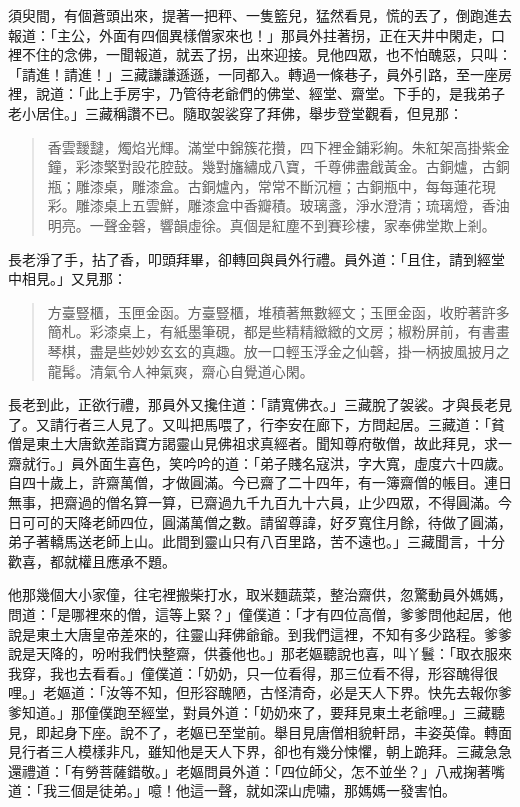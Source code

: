 須臾間，有個蒼頭出來，提著一把秤、一隻籃兒，猛然看見，慌的丟了，倒跑進去報道：「主公，外面有四個異樣僧家來也！」那員外拄著拐，正在天井中閑走，口裡不住的念佛，一聞報道，就丟了拐，出來迎接。見他四眾，也不怕醜惡，只叫：「請進！請進！」三藏謙謙遜遜，一同都入。轉過一條巷子，員外引路，至一座房裡，說道：「此上手房宇，乃管待老爺們的佛堂、經堂、齋堂。下手的，是我弟子老小居住。」三藏稱讚不已。隨取袈裟穿了拜佛，舉步登堂觀看，但見那：
\begin{quote}
香雲靉靆，燭焰光輝。滿堂中錦簇花攢，四下裡金鋪彩絢。朱紅架高掛紫金鐘，彩漆檠對設花腔鼓。幾對旛繡成八寶，千尊佛盡戧黃金。古銅爐，古銅瓶；雕漆桌，雕漆盒。古銅爐內，常常不斷沉檀；古銅瓶中，每每蓮花現彩。雕漆桌上五雲鮮，雕漆盒中香瓣積。玻璃盞，淨水澄清；琉璃燈，香油明亮。一聲金磬，響韻虛徐。真個是紅塵不到賽珍樓，家奉佛堂欺上剎。
\end{quote}

長老淨了手，拈了香，叩頭拜畢，卻轉回與員外行禮。員外道：「且住，請到經堂中相見。」又見那：
\begin{quote}
方臺豎櫃，玉匣金函。方臺豎櫃，堆積著無數經文；玉匣金函，收貯著許多簡札。彩漆桌上，有紙墨筆硯，都是些精精緻緻的文房；椒粉屏前，有書畫琴棋，盡是些妙妙玄玄的真趣。放一口輕玉浮金之仙磬，掛一柄披風披月之龍髯。清氣令人神氣爽，齋心自覺道心閑。
\end{quote}

長老到此，正欲行禮，那員外又攙住道：「請寬佛衣。」三藏脫了袈裟。才與長老見了。又請行者三人見了。又叫把馬喂了，行李安在廊下，方問起居。三藏道：「貧僧是東土大唐欽差詣寶方謁靈山見佛祖求真經者。聞知尊府敬僧，故此拜見，求一齋就行。」員外面生喜色，笑吟吟的道：「弟子賤名寇洪，字大寬，虛度六十四歲。自四十歲上，許齋萬僧，才做圓滿。今已齋了二十四年，有一簿齋僧的帳目。連日無事，把齋過的僧名算一算，已齋過九千九百九十六員，止少四眾，不得圓滿。今日可可的天降老師四位，圓滿萬僧之數。請留尊諱，好歹寬住月餘，待做了圓滿，弟子著轎馬送老師上山。此間到靈山只有八百里路，苦不遠也。」三藏聞言，十分歡喜，都就權且應承不題。

他那幾個大小家僮，往宅裡搬柴打水，取米麵蔬菜，整治齋供，忽驚動員外媽媽，問道：「是哪裡來的僧，這等上緊？」僮僕道：「才有四位高僧，爹爹問他起居，他說是東土大唐皇帝差來的，往靈山拜佛爺爺。到我們這裡，不知有多少路程。爹爹說是天降的，吩咐我們快整齋，供養他也。」那老嫗聽說也喜，叫丫鬟：「取衣服來我穿，我也去看看。」僮僕道：「奶奶，只一位看得，那三位看不得，形容醜得很哩。」老嫗道：「汝等不知，但形容醜陋，古怪清奇，必是天人下界。快先去報你爹爹知道。」那僮僕跑至經堂，對員外道：「奶奶來了，要拜見東土老爺哩。」三藏聽見，即起身下座。說不了，老嫗已至堂前。舉目見唐僧相貌軒昂，丰姿英偉。轉面見行者三人模樣非凡，雖知他是天人下界，卻也有幾分悚懼，朝上跪拜。三藏急急還禮道：「有勞菩薩錯敬。」老嫗問員外道：「四位師父，怎不並坐？」八戒掬著嘴道：「我三個是徒弟。」噫！他這一聲，就如深山虎嘯，那媽媽一發害怕。

